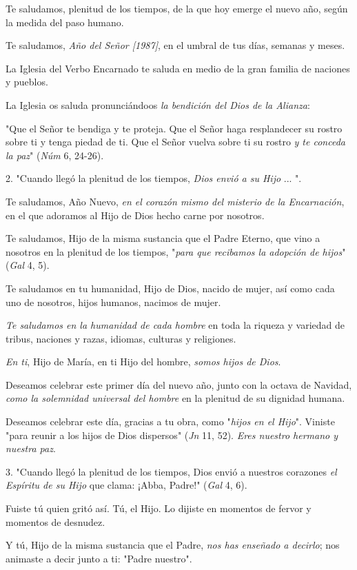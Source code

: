 \begin{body}
Te saludamos, plenitud de los tiempos, de la que hoy emerge el nuevo
año, según la medida del paso humano.

Te saludamos, \emph{Año del Señor {[}1987{]}}, en el umbral de tus días,
semanas y meses.

La Iglesia del Verbo Encarnado te saluda en medio de la gran familia de
naciones y pueblos.

La Iglesia os saluda pronunciándoos \emph{la bendición del Dios de la
	Alianza}:

"Que el Señor te bendiga y te proteja. Que el Señor haga resplandecer su
rostro sobre ti y tenga piedad de ti. Que el Señor vuelva sobre ti su
rostro \emph{y te conceda la paz}" (\emph{Núm} 6, 24-26).

2. "Cuando llegó la plenitud de los tiempos, \emph{Dios envió a su Hijo}
... ".

Te saludamos, Año Nuevo, \emph{en el corazón mismo del misterio de la
	Encarnación}, en el que adoramos al Hijo de Dios hecho carne por
nosotros.

Te saludamos, Hijo de la misma sustancia que el Padre Eterno, que vino a
nosotros en la plenitud de los tiempos, "\emph{para que recibamos la
	adopción de hijos}" (\emph{Gal} 4, 5).

Te saludamos en tu humanidad, Hijo de Dios, nacido de mujer, así como
cada uno de nosotros, hijos humanos, nacimos de mujer.

\emph{Te saludamos en la humanidad de cada hombre} en toda la riqueza y
variedad de tribus, naciones y razas, idiomas, culturas y religiones.

\emph{En ti}, Hijo de María, en ti Hijo del hombre, \emph{somos hijos de
	Dios}.

Deseamos celebrar este primer día del nuevo año, junto con la octava de
Navidad, \emph{como la solemnidad universal del hombre} en la plenitud
de su dignidad humana.

Deseamos celebrar este día, gracias a tu obra, como "\emph{hijos en el
	Hijo}". Viniste "para reunir a los hijos de Dios dispersos" (\emph{Jn}
11, 52). \emph{Eres nuestro hermano y nuestra paz}.

3. "Cuando llegó la plenitud de los tiempos, Dios envió a nuestros
corazones \emph{el Espíritu de su Hijo} que clama: ¡Abba, Padre!"
(\emph{Gal} 4, 6).

Fuiste tú quien gritó así. Tú, el Hijo. Lo dijiste en momentos de fervor
y momentos de desnudez.

Y tú, Hijo de la misma sustancia que el Padre, \emph{nos has enseñado a
	decirlo}; nos animaste a decir junto a ti: "Padre nuestro".


\end{body}
